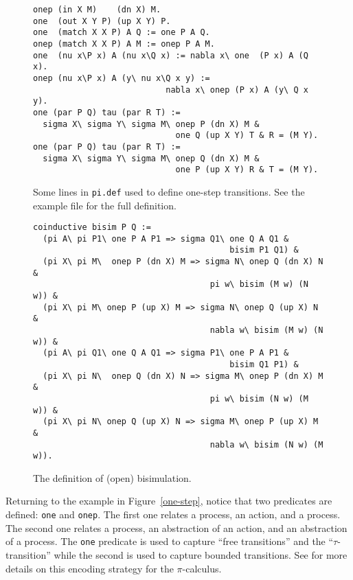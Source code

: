 \documentclass{article}
\begin{document}
\begin{figure}
\begin{verbatim}
onep (in X M)    (dn X) M.
one  (out X Y P) (up X Y) P.
one  (match X X P) A Q := one P A Q.
onep (match X X P) A M := onep P A M.
one  (nu x\P x) A (nu x\Q x) := nabla x\ one  (P x) A (Q x).
onep (nu x\P x) A (y\ nu x\Q x y) :=
                           nabla x\ onep (P x) A (y\ Q x y).
one (par P Q) tau (par R T) :=
  sigma X\ sigma Y\ sigma M\ onep P (dn X) M &
                             one Q (up X Y) T & R = (M Y).
one (par P Q) tau (par R T) :=
  sigma X\ sigma Y\ sigma M\ onep Q (dn X) M &
                             one P (up X Y) R & T = (M Y).
\end{verbatim}
\caption{Some lines in {\tt pi.def} used to define one-step
  transitions.  See the example file for the full definition.}
\label{one-step}

\begin{verbatim}
coinductive bisim P Q :=
  (pi A\ pi P1\ one P A P1 => sigma Q1\ one Q A Q1 &
                                        bisim P1 Q1) &
  (pi X\ pi M\  onep P (dn X) M => sigma N\ onep Q (dn X) N &
                                    pi w\ bisim (M w) (N w)) &
  (pi X\ pi M\ onep P (up X) M => sigma N\ onep Q (up X) N &
                                    nabla w\ bisim (M w) (N w)) &
  (pi A\ pi Q1\ one Q A Q1 => sigma P1\ one P A P1 &
                                        bisim Q1 P1) &
  (pi X\ pi N\  onep Q (dn X) N => sigma M\ onep P (dn X) M &
                                    pi w\ bisim (N w) (M w)) &
  (pi X\ pi N\ onep Q (up X) N => sigma M\ onep P (up X) M &
                                    nabla w\ bisim (N w) (M w)).
\end{verbatim}
\caption{The definition of (open) bisimulation.}
\label{bisim}
\end{figure}

Returning to the example in Figure~\ref{one-step}, notice that two
predicates are defined: {\tt one} and {\tt onep}.  The first one
relates a process, an action, and a process.  The second one relates a
process, an abstraction of an action, and an abstraction of a
process.  The {\tt one} predicate is used to capture ``free
transitions'' and the ``$\tau$-transition'' while the second is used
to capture bounded transitions.  See \cite{tiu04fguc,tiu05concur} for
more details on this encoding strategy for the $\pi$-calculus.
\end{document}
